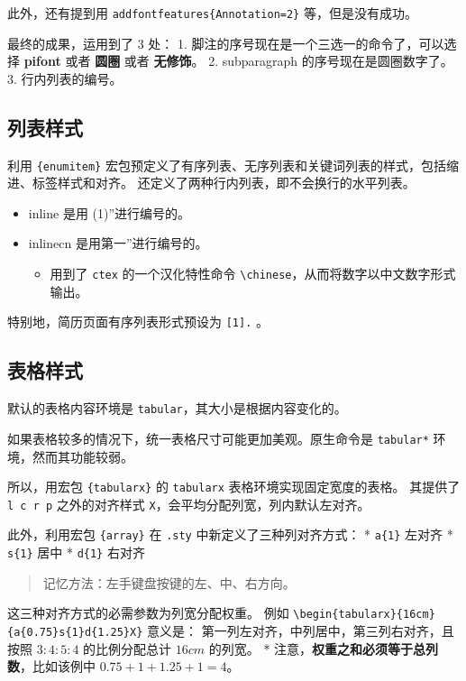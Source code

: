 \documentclass[../Main/thesis.tex]{subfiles}
\begin{document}
此外，还有提到用 \texttt{addfontfeatures\{Annotation=2\}}
等，但是没有成功。

最终的成果，运用到了 3 处： 1.
脚注的序号现在是一个三选一的命令了，可以选择 \textbf{pifont} 或者
\textbf{圆圈} 或者 \textbf{无修饰}。 2. subparagraph
的序号现在是圆圈数字了。 3. 行内列表的编号。

\subsection{列表样式}

利用 \texttt{\{enumitem\}}
宏包预定义了有序列表、无序列表和关键词列表的样式，包括缩进、标签样式和对齐。
还定义了两种行内列表，即不会换行的水平列表。

\begin{itemize}
\item
  inline 是用 (1)''进行编号的。
\item
  inlinecn 是用第一''进行编号的。

  \begin{itemize}
  \item
    用到了 \texttt{ctex} 的一个汉化特性命令
    \texttt{\textbackslash{}chinese}，从而将数字以中文数字形式输出。
  \end{itemize}
\end{itemize}

特别地，简历页面有序列表形式预设为 \texttt{[1].} 。

\subsection{表格样式}

默认的表格内容环境是 \texttt{tabular}，其大小是根据内容变化的。

如果表格较多的情况下，统一表格尺寸可能更加美观。原生命令是
\texttt{tabular*} 环境，然而其功能较弱。

所以，用宏包 \texttt{\{tabularx\}} 的 \texttt{tabularx}
表格环境实现固定宽度的表格。 其提供了 \texttt{l\ c\ r\ p} 之外的对齐样式
\texttt{X}，会平均分配列宽，列内默认左对齐。

此外，利用宏包 \texttt{\{array\}} 在 \texttt{.sty}
中新定义了三种列对齐方式： * \texttt{a\{1\}} 左对齐 * \texttt{s\{1\}}
居中 * \texttt{d\{1\}} 右对齐

\begin{quote}
记忆方法：左手键盘按键的左、中、右方向。
\end{quote}

这三种对齐方式的必需参数为列宽分配权重。 例如
\texttt{\textbackslash{}begin\{tabularx\}\{16cm\}\{a\{0.75\}s\{1\}d\{1.25\}X\}}
意义是： 第一列左对齐，中列居中，第三列右对齐，且按照 \(3:4:5:4\)
的比例分配总计 \(16cm\) 的列宽。 *
注意，\textbf{权重之和必须等于总列数}，比如该例中 \(0.75+1+1.25+1=4\)。
\end{document}
